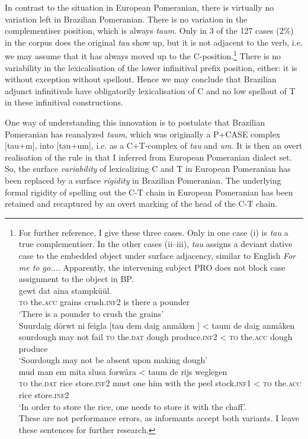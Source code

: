 \documentclass[output=paper,hidelinks,draftmode]{langscibook}
\begin{document}
In contrast to the situation in European Pomeranian, there is virtually no variation left in Brazilian Pomeranian. There is no variation in the complementiser position, which is always \textit{taum}. Only in 3 of the 127 cases (2\%) in the corpus does the original \textit{tau} show up, but it is not adjacent to the verb, i.e. we may assume that it has always moved up to the C-position.\footnote{For further reference, I give these three cases. Only in one case (i) is \textit{tau} a true complementiser. In the other cases (ii--iii), \textit{tau} assigns a deviant dative case to the embedded object under surface adjacency, similar to English \textit{For me to go...}. Apparently, the intervening subject PRO does not block case assignment to the object in BP.\\
\vspace{-\baselineskip}
\ea{} gewt dat aina stampküül. \\
\textsc{to} the.\textsc{acc} grains crush.\textsc{inf2} is there a pounder \\
\glt `There is a pounder to crush the grains'\\
\ex\gll Suurdaig dörwt ni feigla [tau dem daig anmåken ] < taum de daig anmåken \\
sourdough may not fail \textsc{to} the.\textsc{dat} dough produce.\textsc{inf2} {} < \textsc{to} the.\textsc{acc} dough produce \\
\glt `Sourdough may not be absent upon making dough'\\
\ex{} mud man em mita slusa forwåra < taum de rijs weglegen \\
 \textsc{to} the.\textsc{dat} rice store.\textsc{inf2} must one him with {the peel} stock.\textsc{inf1} < \textsc{to} the.\textsc{acc} rice store.\textsc{inf2} \\ 
\glt `In order to store the rice, one needs to store it with the chaff'. \\
\z
These are not performance errors, as informants accept both variants. I leave these sentences for further research.} There is no variability in the lexicalisation of the lower infinitival prefix position, either: it is without exception without spellout. Hence we may conclude that Brazilian adjunct infinitivals have obligatorily lexicalisation of C and no low spellout of T in these infinitival constructions.

\hspace*{-2.2pt}One way of understanding this innovation is to postulate that Brazilian Pomeranian has reanalyzed \textit{taum}, which was originally a P+CASE complex [tau+m], into [tau+um], i.e. as a C+T-complex of \textit{tau} and \textit{um}. It is then an overt realisation of the rule in  that I inferred from European Pomeranian dialect set. So, the surface \textit{variability} of lexicalizing C and T in European Pomeranian has been replaced by a surface \textit{rigidity} in Brazilian Pomeranian. The underlying formal rigidity of spelling out the C-T chain in European Pomeranian has been retained and recaptured by an overt marking of the head of the C-T chain.
\end{document}
